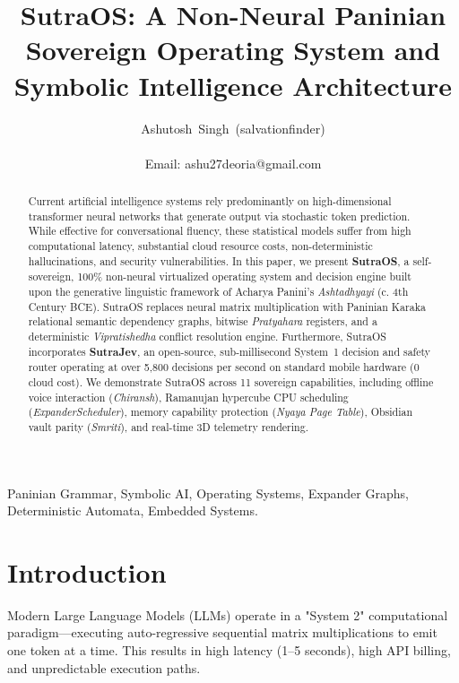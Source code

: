 \documentclass[10pt,journal,compsoc]{IEEEtran}
\begin{document}
\title{SutraOS: A Non-Neural Paninian Sovereign Operating System and Symbolic Intelligence Architecture}

\author{Ashutosh~Singh~(salvationfinder)\\
\\
Email: ashu27deoria@gmail.com}

\maketitle

\begin{abstract}
Current artificial intelligence systems rely predominantly on high-dimensional transformer neural networks that generate output via stochastic token prediction. While effective for conversational fluency, these statistical models suffer from high computational latency, substantial cloud resource costs, non-deterministic hallucinations, and security vulnerabilities. In this paper, we present \textbf{SutraOS}, a self-sovereign, 100\% non-neural virtualized operating system and decision engine built upon the generative linguistic framework of Acharya Panini's \textit{Ashtadhyayi} (c. 4th Century BCE). SutraOS replaces neural matrix multiplication with Paninian Karaka relational semantic dependency graphs, bitwise \textit{Pratyahara} registers, and a deterministic \textit{Vipratishedha} conflict resolution engine. Furthermore, SutraOS incorporates \textbf{SutraJev}, an open-source, sub-millisecond System~1 decision and safety router operating at over 5,800 decisions per second on standard mobile hardware ($0$ cloud cost). We demonstrate SutraOS across 11 sovereign capabilities, including offline voice interaction (\textit{Chiransh}), Ramanujan hypercube CPU scheduling (\textit{ExpanderScheduler}), memory capability protection (\textit{Nyaya Page Table}), Obsidian vault parity (\textit{Smriti}), and real-time 3D telemetry rendering.
\end{abstract}

\begin{IEEEkeywords}
Paninian Grammar, Symbolic AI, Operating Systems, Expander Graphs, Deterministic Automata, Embedded Systems.
\end{IEEEkeywords}

\section{Introduction}
Modern Large Language Models (LLMs) operate in a "System 2" computational paradigm—executing auto-regressive sequential matrix multiplications to emit one token at a time. This results in high latency (1--5 seconds), high API billing, and unpredictable execution paths.
\end{document}
